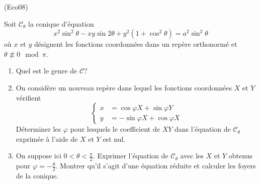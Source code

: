 \begin{tiny}(Eco08)\end{tiny} Soit $\mathcal C_\theta$ la conique d'équation
\begin{displaymath}
 x^2 \sin^2\theta -xy\sin2\theta + y^2(1+\cos^2\theta) = a^2\sin^2\theta
\end{displaymath}
 où $x$ et $y$ désignent les fonctions coordonnées dans un repère orthonormé et $\theta\not \equiv 0 \mod \pi$.
\begin{enumerate}
 \item Quel est le genre de $\mathcal C$?
 \item On considère un nouveau repère dans lequel les fonctions coordonnées $X$ et $Y$ vérifient
\begin{displaymath}
 \left\lbrace 
\begin{aligned}
 x &= \cos \varphi X +\sin \varphi Y \\
 y &= -\sin \varphi X +\cos \varphi X 
\end{aligned}
\right. 
\end{displaymath}
Déterminer les $\varphi$ pour lesquels le coefficient de $XY$ dans l'équation de $\mathcal C_\theta$ exprimée à l'aide de $X$ et $Y$ est nul.
\item On suppose ici $0<\theta<\frac{\pi}{2}$. Exprimer l'équation de $\mathcal C_\theta$ avec les $X$ et $Y$ obtenus pour $\varphi=-\frac{\theta}{2}$. Montrer qu'il s'agit d'une équation réduite et calculer les foyers de la conique.
\end{enumerate}
